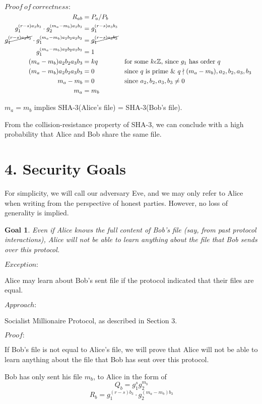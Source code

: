 \documentclass{article}
\newtheorem{goal}{Goal}
\begin{document}
$Proof\ of\ correctness:$
\begin{align*}
  R_{ab} &= P_a / P_b\\
  g_1^{(r-s)a_3b_3} \cdot g_2^{(m_a-m_b)a_3b_3} &= g_1^{(r-s)a_3b_3}\\
  \cancel{g_1^{(r-s)a_3b_3}} \cdot g_1^{(m_a-m_b)a_2b_2a_3b_3} &= \cancel{g_1^{(r-s)a_3b_3}}\\
  g_1^{(m_a-m_b)a_2b_2a_3b_3} &= 1\\
  (m_a-m_b)a_2b_2a_3b_3 &= kq && \text{for some $k \epsilon \mathbb{Z}$, since $g_1$ has order $q$}\\
  (m_a-m_b)a_2b_2a_3b_3 &= 0 && \text{since $q$ is prime \&\ } q \nmid (m_a-m_b), a_2, b_2,a_3, b_3\\
  m_a - m_b &= 0 &&\text{since $a_2, b_2, a_3, b_3 \neq 0$}\\
  m_a &= m_b
\end{align*}

$m_a = m_b$ implies SHA-3(Alice's file) = SHA-3(Bob's file).

From the collision-resistance property of SHA-3, we can conclude with a high probability 
that Alice and Bob share the same file.

\section*{4. Security Goals}

For simplicity, we will call our adversary Eve, and we may only refer to Alice
when writing from the perspective of honest parties. However, no loss of generality 
is implied.

\begin{goal}
Even if Alice knows the full content of Bob's file (say, from past protocol interactions),
Alice will not be able to learn anything about the file that Bob sends over this protocol.
\end{goal}

$Exception:$ 

Alice may learn about Bob's sent file if the protocol indicated that their files are equal.

$Approach:$ 

Socialist Millionaire Protocol, as described in Section 3.

$Proof:$

If Bob's file is not equal to Alice's file, we will prove that Alice will not be able 
to learn anything about the file that Bob has sent over this protocol.

Bob has only sent his file $m_b$, to Alice in the form of $$Q_b = g_1^sg_2^{m_b}$$  
$$R_{b} = g_1^{(r-s)b_3} \cdot g_2^{(m_a-m_b)b_3}$$ 
\end{document}
